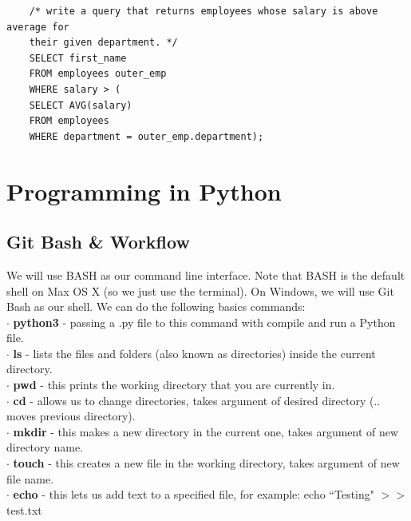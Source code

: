 \documentclass[11pt, a4paper]{article}
\begin{document}
\begin{spacing}{1.1}
\begin{lstlisting}
	/* write a query that returns employees whose salary is above average for 
	their given department. */
	SELECT first_name
	FROM employees outer_emp
	WHERE salary > (
	SELECT AVG(salary)
	FROM employees
	WHERE department = outer_emp.department); \end{lstlisting}\newpage
	

	\section{Programming in Python}	
	\lstset{style=Pythonstyle}
	\subsection{Git Bash \& Workflow}
	We will use BASH as our command line interface. Note that BASH is the default shell on Max OS X (so we just use the terminal). On Windows, we will use Git Bash as our shell. We can do the following basics commands: \vspace*{1mm} \\
	\hspace*{1.5mm} $\cdot$ \textbf{python3} - passing a .py file to this command with compile and run a Python file. \\
	\hspace*{1.5mm} $\cdot$ \textbf{ls} - lists the files and folders (also known as directories) inside the current directory. \\
	\hspace*{1.5mm} $\cdot$ \textbf{pwd} - this prints the working directory that you are currently in. \\
	\hspace*{1.5mm} $\cdot$ \textbf{cd} - allows us to change directories, takes argument of desired directory (.. moves previous directory). \\
	\hspace*{1.5mm} $\cdot$ \textbf{mkdir} - this makes a new directory in the current one, takes argument of new directory name. \\
	\hspace*{1.5mm} $\cdot$ \textbf{touch} - this creates a new file in the working directory, takes argument of new file name. \\
	\hspace*{1.5mm} $\cdot$ \textbf{echo} - this lets us add text to a specified file, for example: echo ``Testing" $>>$ test.txt \\

\end{spacing}
\end{document}
